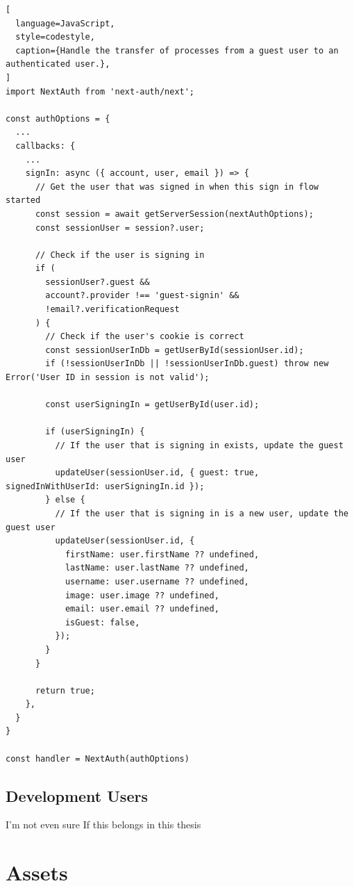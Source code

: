\begin{lstlisting}[
  language=JavaScript,
  style=codestyle,
  caption={Handle the transfer of processes from a guest user to an authenticated user.},
]
import NextAuth from 'next-auth/next';

const authOptions = {
  ...
  callbacks: {
    ...
    signIn: async ({ account, user, email }) => {
      // Get the user that was signed in when this sign in flow started
      const session = await getServerSession(nextAuthOptions);
      const sessionUser = session?.user;

      // Check if the user is signing in
      if (
        sessionUser?.guest &&
        account?.provider !== 'guest-signin' &&
        !email?.verificationRequest
      ) {
        // Check if the user's cookie is correct
        const sessionUserInDb = getUserById(sessionUser.id);
        if (!sessionUserInDb || !sessionUserInDb.guest) throw new Error('User ID in session is not valid');

        const userSigningIn = getUserById(user.id);

        if (userSigningIn) {
          // If the user that is signing in exists, update the guest user
          updateUser(sessionUser.id, { guest: true, signedInWithUserId: userSigningIn.id });
        } else {
          // If the user that is signing in is a new user, update the guest user
          updateUser(sessionUser.id, {
            firstName: user.firstName ?? undefined,
            lastName: user.lastName ?? undefined,
            username: user.username ?? undefined,
            image: user.image ?? undefined,
            email: user.email ?? undefined,
            isGuest: false,
          });
        }
      }

      return true;
    },
  }
}

const handler = NextAuth(authOptions)
\end{lstlisting}


\subsection{Development Users}
\label{cha:ms-architecture:users:development-users}

I'm not even sure If this belongs in this thesis

\section{Assets}

